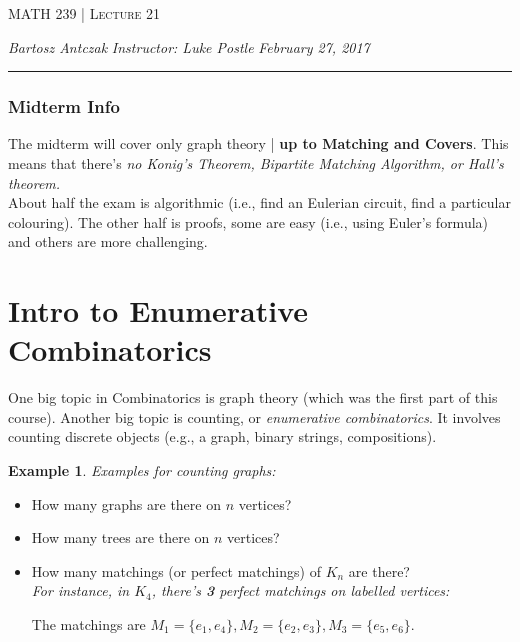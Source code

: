\documentclass{report}
\newcommand{\lectureNum}{21}
\newcommand{\curDate}{February 27, 2017}
\newcommand{\course}{MATH 239}
\newcommand{\instructor}{Luke Postle}
\newtheorem{ex}{Example}[section]
\begin{document}
\begin{center}
\begin{Large}
\textsc{\course{} | Lecture \lectureNum{}}
\end{Large}
\end{center} 
\noindent \textit{Bartosz Antczak} \hfill
\textit{Instructor: \instructor{}} \hfill
\textit{\curDate{}}
\rule{\textwidth}{0.4pt}
\subsubsection{Midterm Info}
The midterm will cover only graph theory | \textbf{up to Matching and Covers}. This means that there's \textit{no Konig's Theorem, Bipartite Matching Algorithm, or Hall's theorem.}\\
About half the exam is algorithmic (i.e., find an Eulerian circuit, find a particular colouring). The other half is proofs, some are easy (i.e., using Euler's formula) and others are more challenging.
\section{Intro to Enumerative Combinatorics}
One big topic in Combinatorics is graph theory (which was the first part of this course). Another big topic is counting, or \textit{enumerative combinatorics}. It involves counting discrete objects (e.g., a graph, binary strings, compositions).
\begin{ex}
Examples for counting graphs:
\end{ex}
\begin{itemize}
\item How many graphs are there on $n$ vertices?
\item How many trees are there on $n$ vertices?
\item How many matchings (or perfect matchings) of $K_n$ are there?\\
\textit{For instance, in $K_4$, there's \textbf{3} perfect matchings on labelled vertices:}
\begin{center}
\end{center}
The matchings are $M_1 = \{e_1, e_4\}, M_2 = \{e_2, e_3\}, M_3 = \{e_5, e_6\}$.
\end{itemize}
\end{document}
